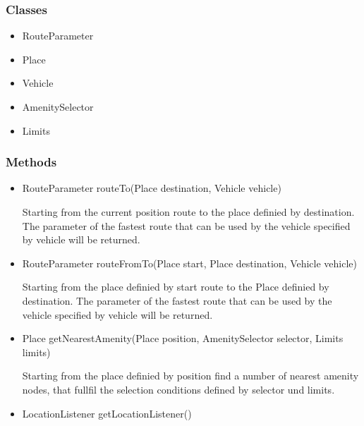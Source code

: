 \subsubsection{Classes}

\begin{itemize}

	\item RouteParameter\newline
	\item Place\newline
	\item Vehicle\newline
	\item AmenitySelector\newline
	\item Limits\newline

\end{itemize}

\subsubsection{Methods}

\begin{itemize}

	\item RouteParameter routeTo(Place destination, Vehicle vehicle)\newline
	
	Starting from the current position route to the place definied by destination. The parameter of the fastest route that can be used by the vehicle specified by vehicle will be returned.	
	
	\item RouteParameter routeFromTo(Place start, Place destination, Vehicle vehicle)\newline
	
	Starting from the place definied by start route to the Place definied by destination. The parameter of the fastest route that can be used by the vehicle specified by vehicle will be returned.
	
	\item Place getNearestAmenity(Place position, AmenitySelector selector, Limits limits)\newline

	Starting from the place definied by position find a number of nearest amenity nodes, that fullfil the selection conditions defined by selector und limits. 
	
	\item LocationListener getLocationListener()\newline
	
	

\end{itemize}